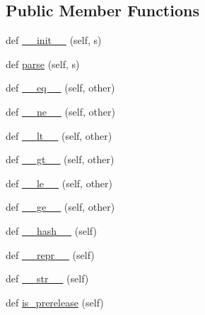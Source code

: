 \subsection*{Public Member Functions}
\begin{DoxyCompactItemize}
\item 
def \hyperlink{classpip_1_1__vendor_1_1distlib_1_1version_1_1Version_ad3e4897941ecd683383c0d8743a62957}{\+\_\+\+\_\+init\+\_\+\+\_\+} (self, s)
\item 
def \hyperlink{classpip_1_1__vendor_1_1distlib_1_1version_1_1Version_a150d6fd36991a7754d84626a6819aa27}{parse} (self, s)
\item 
def \hyperlink{classpip_1_1__vendor_1_1distlib_1_1version_1_1Version_aee1eb8a02ce7ef4b9af8a4e84d1c1361}{\+\_\+\+\_\+eq\+\_\+\+\_\+} (self, other)
\item 
def \hyperlink{classpip_1_1__vendor_1_1distlib_1_1version_1_1Version_a1611bd1a9e639a33b671db6066c035c6}{\+\_\+\+\_\+ne\+\_\+\+\_\+} (self, other)
\item 
def \hyperlink{classpip_1_1__vendor_1_1distlib_1_1version_1_1Version_a09f74b0c52ee4bb49d431475d6263df6}{\+\_\+\+\_\+lt\+\_\+\+\_\+} (self, other)
\item 
def \hyperlink{classpip_1_1__vendor_1_1distlib_1_1version_1_1Version_a98a7c7052778f3ed12f0321e740579a2}{\+\_\+\+\_\+gt\+\_\+\+\_\+} (self, other)
\item 
def \hyperlink{classpip_1_1__vendor_1_1distlib_1_1version_1_1Version_aa0225a6f551bfccb3c669645895dfdb8}{\+\_\+\+\_\+le\+\_\+\+\_\+} (self, other)
\item 
def \hyperlink{classpip_1_1__vendor_1_1distlib_1_1version_1_1Version_a3b9dd76b307e2bfd1ced1dc0ea4fede7}{\+\_\+\+\_\+ge\+\_\+\+\_\+} (self, other)
\item 
def \hyperlink{classpip_1_1__vendor_1_1distlib_1_1version_1_1Version_ac0e7297163109c0aa1311f3b93e1c39d}{\+\_\+\+\_\+hash\+\_\+\+\_\+} (self)
\item 
def \hyperlink{classpip_1_1__vendor_1_1distlib_1_1version_1_1Version_a06ea8151ff9c0dc41298492fca7ba208}{\+\_\+\+\_\+repr\+\_\+\+\_\+} (self)
\item 
def \hyperlink{classpip_1_1__vendor_1_1distlib_1_1version_1_1Version_a9af5713e03383b8e065a40d81bfd92b1}{\+\_\+\+\_\+str\+\_\+\+\_\+} (self)
\item 
def \hyperlink{classpip_1_1__vendor_1_1distlib_1_1version_1_1Version_acc07a1192355549844209f2240a7f3af}{is\+\_\+prerelease} (self)
\end{DoxyCompactItemize}


